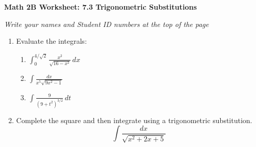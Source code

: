 \documentclass[12pt,fleqn]{article}
\begin{document}
\begin{center}
	\textbf{Math 2B Worksheet: 7.3 Trigonometric Substitutions}
\end{center}

\emph{Write your names and Student ID numbers at the top of the page}

\begin{enumerate}
\item Evaluate the integrals:
\begin{enumerate}
\item $\displaystyle \int_0^{4/\sqrt{2}}\frac{x^2}{\sqrt{16-x^2}}\,dx$\vfill


\item $\displaystyle \int\frac{dx}{x^5\sqrt{9x^2-1}}$\vfill

\newpage

\item $\displaystyle \int\frac{9}{(9+t^2)^{3/2}}\,dt$\vfill
\end{enumerate}

\item Complete the square and then integrate using a trigonometric substitution.\\
\[\int\frac{dx}{\sqrt{x^2+2x+5}}\]


\vfill

\end{enumerate}
\end{document}
